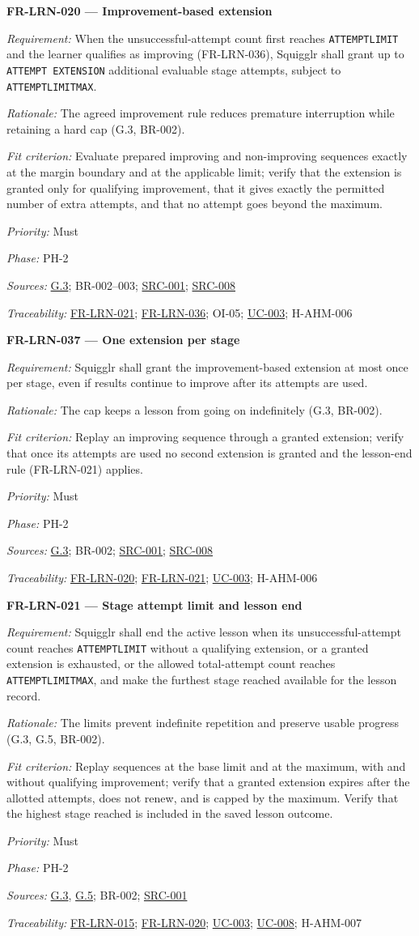 \documentclass[12pt]{article}
\renewcommand{\_}{\textunderscore\allowbreak}%
\newcommand{\goalref}[1]{\hyperref[goal:#1]{G.#1}}
\newcommand{\ucref}[1]{\hyperref[uc:#1]{\mbox{UC-#1}}}
\newenvironment{srsrequirement}[2]{%
  \par\medskip\noindent\phantomsection\label{req:#1}%
  \textbf{#1 --- #2}\par\nobreak\smallskip }{\par\medskip}
\newcommand{\reqfield}[2]{\noindent\textit{#1:} #2\par}
\newcommand{\reqshall}[1]{\reqfield{Requirement}{#1}}
\newcommand{\reqrationale}[1]{\reqfield{Rationale}{#1}}
\newcommand{\reqfit}[1]{\reqfield{Fit criterion}{#1}}
\newcommand{\reqpriority}[1]{\reqfield{Priority}{#1}}
\newcommand{\reqphase}[1]{\reqfield{Phase}{#1}}
\newcommand{\reqsources}[1]{\reqfield{Sources}{#1}}
\newcommand{\reqtraces}[1]{\reqfield{Traceability}{#1}}
\newcommand{\reqref}[1]{\hyperref[req:#1]{#1}}
\newcommand{\srcref}[1]{\hyperref[src:#1]{SRC-#1}}
\providecommand{\ucref}[1]{\hyperref[uc:#1]{UC-#1}}
\begin{document}
\begin{srsrequirement}{FR-LRN-020}{Improvement-based extension}
  \reqshall{When the unsuccessful-attempt count first reaches
\texttt{ATTEMPT\_\allowbreak LIMIT} and the learner qualifies as improving
(FR-LRN-036), Squigglr shall grant up to \texttt{ATTEMPT\_\allowbreak
EXTENSION} additional evaluable stage attempts, subject to
\texttt{ATTEMPT\_\allowbreak LIMIT\_\allowbreak MAX}.} \reqrationale{The agreed
improvement rule reduces premature interruption while retaining a hard cap
(G.3, BR-002).} \reqfit{Evaluate prepared improving and non-improving sequences
exactly at the margin boundary and at the applicable limit; verify that the
extension is granted only for qualifying improvement, that it gives exactly the
permitted number of extra attempts, and that no attempt goes beyond the
maximum.}
  \reqpriority{Must}
  \reqphase{PH-2}
  \reqsources{\goalref{3}; BR-002--003; \srcref{001}; \srcref{008}}
  \reqtraces{\reqref{FR-LRN-021}; \reqref{FR-LRN-036}; OI-05; \ucref{003};
  H-AHM-006}
\end{srsrequirement}

\begin{srsrequirement}{FR-LRN-037}{One extension per stage}
  \reqshall{Squigglr shall grant the improvement-based extension at most once
per stage, even if results continue to improve after its attempts are used.}
\reqrationale{The cap keeps a lesson from going on indefinitely (G.3, BR-002).}
\reqfit{Replay an improving sequence through a granted extension; verify that
once its attempts are used no second extension is granted and the lesson-end
rule (FR-LRN-021) applies.}
  \reqpriority{Must}
  \reqphase{PH-2}
  \reqsources{\goalref{3}; BR-002; \srcref{001}; \srcref{008}}
  \reqtraces{\reqref{FR-LRN-020}; \reqref{FR-LRN-021}; \ucref{003}; H-AHM-006}
\end{srsrequirement}

\begin{srsrequirement}{FR-LRN-021}{Stage attempt limit and lesson end}
  \reqshall{Squigglr shall end the active lesson when its unsuccessful-attempt
count reaches \texttt{ATTEMPT\_\allowbreak LIMIT} without a qualifying
extension, or a granted extension is exhausted, or the allowed total-attempt
count reaches \texttt{ATTEMPT\_\allowbreak LIMIT\_\allowbreak MAX}, and make the
furthest stage reached available for the lesson record.} \reqrationale{The
limits prevent indefinite repetition and preserve usable progress (G.3, G.5,
BR-002).} \reqfit{Replay sequences at the base limit and at the maximum, with
and without qualifying improvement; verify that a granted extension expires
after the allotted attempts, does not renew, and is capped by the maximum.
Verify that the highest stage reached is included in the saved lesson outcome.}
  \reqpriority{Must}
  \reqphase{PH-2}
  \reqsources{\goalref{3}, \goalref{5}; BR-002; \srcref{001}}
  \reqtraces{\reqref{FR-LRN-015}; \reqref{FR-LRN-020}; \ucref{003}; \ucref{008};
  H-AHM-007}
\end{srsrequirement}
\end{document}
